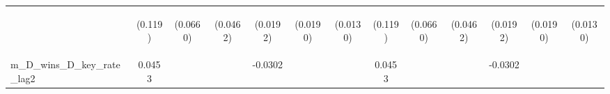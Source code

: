 \documentclass[]{article}
\begin{document}
\begin{center}
\begin{tabular}{lcccccccccccc}
\vspace{4pt} & \begin{footnotesize}(0.119)\end{footnotesize} & \begin{footnotesize}(0.0660)\end{footnotesize} & \begin{footnotesize}(0.0462)\end{footnotesize} & \begin{footnotesize}(0.0192)\end{footnotesize} & \begin{footnotesize}(0.0190)\end{footnotesize} & \begin{footnotesize}(0.0130)\end{footnotesize} & \begin{footnotesize}(0.119)\end{footnotesize} & \begin{footnotesize}(0.0660)\end{footnotesize} & \begin{footnotesize}(0.0462)\end{footnotesize} & \begin{footnotesize}(0.0192)\end{footnotesize} & \begin{footnotesize}(0.0190)\end{footnotesize} & \begin{footnotesize}(0.0130)\end{footnotesize} \\
m\_D\_wins\_D\_key\_rate\_lag2 & 0.0453 &  &  & -0.0302 &  &  & 0.0453 &  &  & -0.0302 &  &  \\

\end{tabular}
\end{center}
\end{document}
